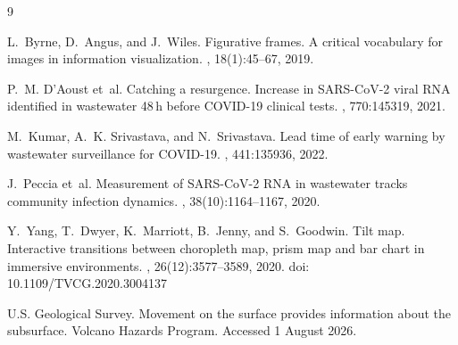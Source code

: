 \documentclass{vgtc}                %
\begin{document}
\begin{thebibliography}{9}

L.~Byrne, D.~Angus, and J.~Wiles.
\newblock Figurative frames. A critical vocabulary for images in information
  visualization.
, 18(1):45--67, 2019.

P.~M. D'Aoust et~al.
\newblock Catching a resurgence. Increase in {SARS-CoV-2} viral {RNA} identified
  in wastewater 48\,h before {COVID-19} clinical tests.
, 770:145319, 2021.

M.~Kumar, A.~K. Srivastava, and N.~Srivastava.
\newblock Lead time of early warning by wastewater surveillance for
  {COVID-19}.
, 441:135936, 2022.

J.~Peccia et~al.
\newblock Measurement of {SARS-CoV-2} {RNA} in wastewater tracks community
  infection dynamics.
, 38(10):1164--1167, 2020.

Y.~Yang, T.~Dwyer, K.~Marriott, B.~Jenny, and S.~Goodwin.
\newblock Tilt map. Interactive transitions between choropleth map, prism map and
  bar chart in immersive environments.
,
  26(12):3577--3589, 2020. doi\string: 10.1109/TVCG.2020.3004137

U.S. Geological Survey.
\newblock Movement on the surface provides information about the subsurface.
\newblock Volcano Hazards Program. Accessed 1 August 2026.

\end{thebibliography}
\end{document}
